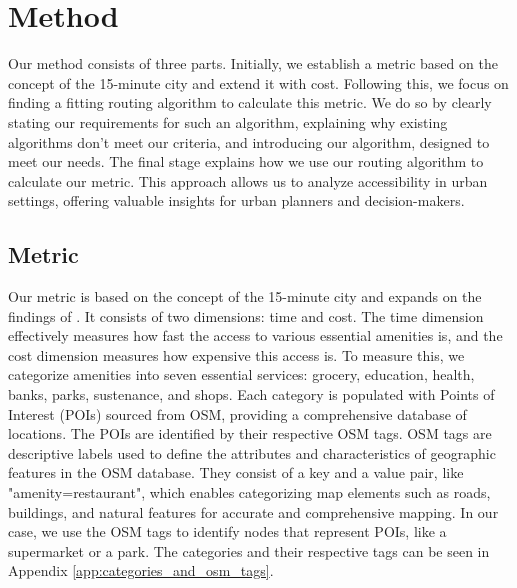 \clearpage
\section{Method}
\label{sec:method}

Our method consists of three parts.
Initially, we establish a metric based on the concept of the 15-minute city and extend it with cost.
Following this, we focus on finding a fitting routing algorithm to calculate this metric.
We do so by clearly stating our requirements for such an algorithm, explaining why existing algorithms don't meet our criteria, and introducing our algorithm, designed to meet our needs. 
The final stage explains how we use our routing algorithm to calculate our metric. 
This approach allows us to analyze accessibility in urban settings, offering valuable insights for urban planners and decision-makers.

\subsection{Metric}
\label{subsec:metric}

Our metric is based on the concept of the 15-minute city and expands on the findings of .
It consists of two dimensions: time and cost.
The time dimension effectively measures how fast the access to various essential amenities is, and the cost dimension measures how expensive this access is.
To measure this, we categorize amenities into seven essential services: grocery, education, health, banks, parks, sustenance, and shops.
Each category is populated with Points of Interest (POIs) sourced from OSM, providing a comprehensive database of locations.
The POIs are identified by their respective OSM tags.
OSM tags are descriptive labels used to define the attributes and characteristics of geographic features in the OSM database. 
They consist of a key and a value pair, like "amenity=restaurant", which enables categorizing map elements such as roads, buildings, and natural features for accurate and comprehensive mapping.
In our case, we use the OSM tags to identify nodes that represent POIs, like a supermarket or a park.
The categories and their respective tags can be seen in Appendix \ref{app:categories_and_osm_tags}.

